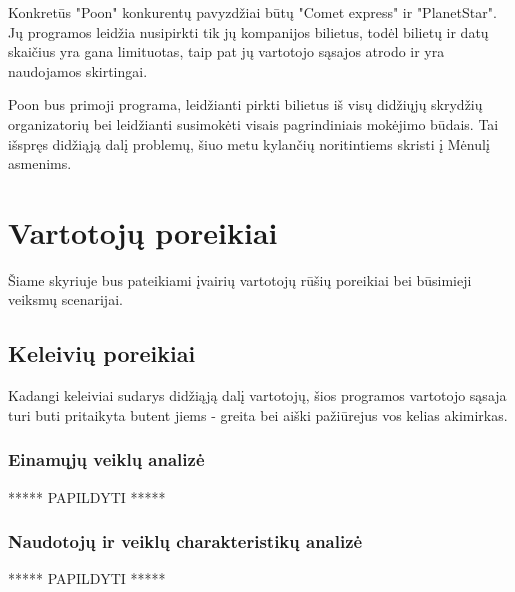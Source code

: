 \documentclass{VUMIFPSkursinis}
\begin{document}
Konkretūs "Poon" konkurentų pavyzdžiai būtų "Comet express" ir "PlanetStar". Jų programos leidžia nusipirkti tik jų kompanijos bilietus, todėl bilietų ir datų skaičius yra gana limituotas, taip pat jų vartotojo sąsajos atrodo ir yra naudojamos skirtingai. 

Poon bus primoji programa, leidžianti pirkti bilietus iš visų didžiųjų skrydžių organizatorių bei leidžianti susimokėti visais pagrindiniais mokėjimo būdais. Tai išspręs didžiąją dalį problemų, šiuo metu kylančių noritintiems skristi į Mėnulį asmenims.


\section{Vartotojų poreikiai}
Šiame skyriuje bus pateikiami įvairių vartotojų rūšių poreikiai bei būsimieji veiksmų scenarijai.

\subsection{Keleivių poreikiai}
Kadangi keleiviai sudarys didžiąją dalį vartotojų, šios programos vartotojo sąsaja turi buti pritaikyta butent jiems - greita bei aiški pažiūrejus vos kelias akimirkas.

\subsubsection{Einamųjų veiklų analizė}
\centerline{***** PAPILDYTI *****}

\subsubsection{Naudotojų ir veiklų charakteristikų analizė}
\centerline{***** PAPILDYTI *****}
\end{document}
